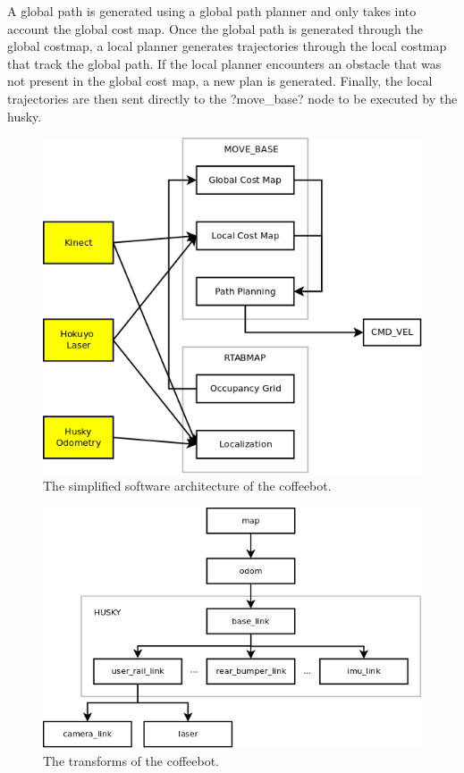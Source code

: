 \documentclass[letterpaper, 10 pt, conference]{ieeeconf}  %
\begin{document}
A global path is generated using a global path planner and only takes into account the global cost map. Once the global path is generated through the global costmap, a local planner generates trajectories through the local costmap that track the global path. If the local planner encounters an obstacle that was not present in the global cost map, a new plan is generated. Finally, the local trajectories are then sent directly to the ?move\_base? node to be executed by the husky. 

	\begin{figure}[!ht]
		\centering
		\includegraphics[width=1.0\columnwidth]{Figures/ROS_node_diagram}
		\caption{The simplified software architecture of the coffeebot.}
		\label{software_architecture}
	\end{figure}
	
	\begin{figure}[!ht]
		\centering
		\includegraphics[width=1.0\columnwidth]{Figures/ROS_TF_diagram}
		\caption{The transforms of the coffeebot.}
		\label{transform_tree}
	\end{figure}
\end{document}
